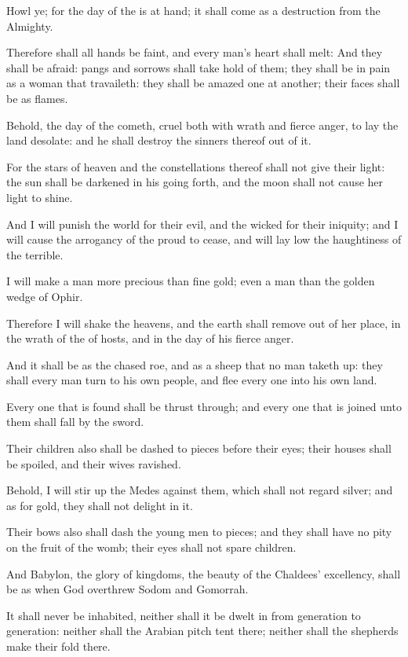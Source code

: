\Verse Howl ye; for the day of the \LORD is at hand; it shall come as a destruction from the Almighty.

\Verse Therefore shall all hands be faint, and every man's heart shall melt: \Verse And they shall be afraid: pangs and sorrows shall take hold of them; they shall be in pain as a woman that travaileth: they shall be amazed one at another; their faces shall be as flames.

\Verse Behold, the day of the \LORD cometh, cruel both with wrath and fierce anger, to lay the land desolate: and he shall destroy the sinners thereof out of it.

\Verse For the stars of heaven and the constellations thereof shall not give their light: the sun shall be darkened in his going forth, and the moon shall not cause her light to shine.

\Verse And I will punish the world for their evil, and the wicked for their iniquity; and I will cause the arrogancy of the proud to cease, and will lay low the haughtiness of the terrible.

\Verse I will make a man more precious than fine gold; even a man than the golden wedge of Ophir.

\Verse Therefore I will shake the heavens, and the earth shall remove out of her place, in the wrath of the \LORD of hosts, and in the day of his fierce anger.

\Verse And it shall be as the chased roe, and as a sheep that no man taketh up: they shall every man turn to his own people, and flee every one into his own land.

\Verse Every one that is found shall be thrust through; and every one that is joined unto them shall fall by the sword.

\Verse Their children also shall be dashed to pieces before their eyes; their houses shall be spoiled, and their wives ravished.

\Verse Behold, I will stir up the Medes against them, which shall not regard silver; and as for gold, they shall not delight in it.

\Verse Their bows also shall dash the young men to pieces; and they shall have no pity on the fruit of the womb; their eyes shall not spare children.

\Verse And Babylon, the glory of kingdoms, the beauty of the Chaldees' excellency, shall be as when God overthrew Sodom and Gomorrah.

\Verse It shall never be inhabited, neither shall it be dwelt in from generation to generation: neither shall the Arabian pitch tent there; neither shall the shepherds make their fold there.

